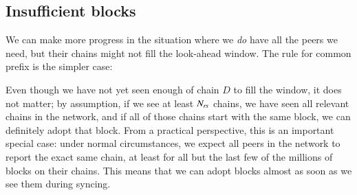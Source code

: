 \subsection{Insufficient blocks}
\label{genesis:insufficient-blocks}

We can make more progress in the situation where we \emph{do} have all the peers
we need, but their chains might not fill the look-ahead window. The rule for
common prefix is the simpler case:
%
\begin{center}
\end{center}
%
Even though we have not yet seen enough of chain $D$ to fill the window, it does
not matter; by assumption, if we see at least $N_\mathit{rs}$ chains, we have
seen all relevant chains in the network, and if all of those chains start with
the same block, we can definitely adopt that block. From a practical
perspective, this is an important special case: under normal circumstances, we
expect all peers in the network to report the exact same chain, at least for all
but the last few of the millions of blocks on their chains. This means that we
can adopt blocks almost as soon as we see them during syncing.

\pagebreak

